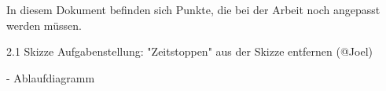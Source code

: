 
In diesem Dokument befinden sich Punkte, die bei der Arbeit noch angepasst werden müssen.

2.1 Skizze Aufgabenstellung:
"Zeitstoppen" aus der Skizze entfernen (@Joel)


- Ablaufdiagramm